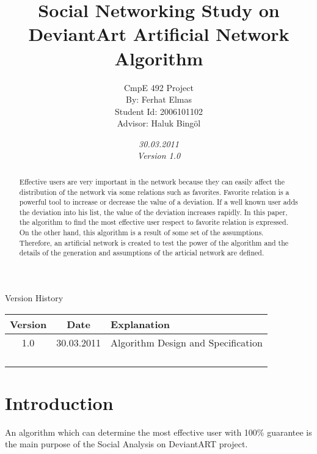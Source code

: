 \documentclass[12pt,a4paper]{report}
\title{Social Networking Study on DeviantArt Artificial Network Algorithm}
\date{\emph{30.03.2011} \\ \emph{Version 1.0} }
\author{CmpE 492 Project\\
	By: Ferhat Elmas \\
	Student Id: 2006101102\\
	Advisor: Haluk Bing\"{o}l
}
\begin{document}

\maketitle

\begin{table}[htdp]
\begin{center}
\textup{\Huge Version History}
\begin{tabular}{|c|c|p{10cm}|}
\hline
\textbf{Version} & \textbf{Date} & \textbf{Explanation} \\
\hline
1.0 & 30.03.2011 &Algorithm Design and Specification \\
\hline
&&\\
\hline
&&\\
\hline
&&\\
\hline
&&\\
\hline
\end{tabular}
\end{center}
\end{table}


\begin{abstract}
	
	Effective users are very important in the network because they can easily affect the distribution of the network via some relations such as favorites. Favorite relation is a powerful tool to increase or decrease the value of a deviation. If a well known user adds the deviation into his list, the value of the deviation increases rapidly. In this paper, the algorithm to find the most effective user respect to favorite relation is expressed. \\
	
	On the other hand, this algorithm is a result of some set of the assumptions. Therefore, an artificial network is created to test the power of the algorithm and the details of the generation and assumptions of the articial network are defined.
\end{abstract}

\tableofcontents

\chapter{Introduction}
	
	An algorithm which can determine the most effective user with 100\% guarantee is the main purpose of  the Social Analysis on DeviantART project. \\	
	
\end{document}
